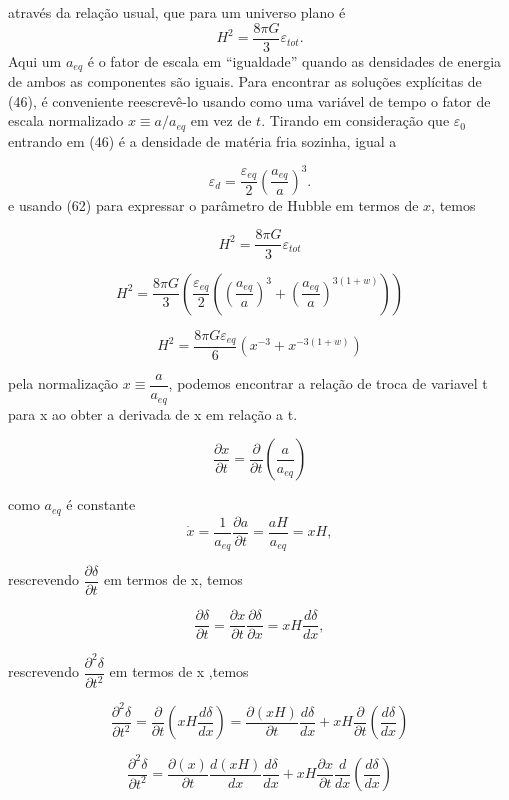\documentclass[a4paper,12pt]{article}
\begin{document}
através da relação usual, que para um universo plano é 
\begin{equation}
	H^2 = \dfrac{8\pi G}{3}\varepsilon_{tot}.
\end{equation}
Aqui um $a_{eq}$ é o fator de escala em “igualdade” quando as densidades de energia de ambos as componentes são iguais. Para encontrar as soluções explícitas de (46), é conveniente reescrevê-lo
usando como uma variável de tempo o fator de escala normalizado $x \equiv a / a_{eq}$ em vez de $t$. Tirando
em consideração que $\varepsilon_0$ entrando em (46) é a densidade de matéria fria sozinha, igual a

\begin{equation}
	\varepsilon_d = \dfrac{\varepsilon_{eq}}{2}\left(\dfrac{a_{eq}}{a}\right)^3.
\end{equation}
e usando (62) para expressar o parâmetro de Hubble em termos de $x$, temos

$$H^2 = \dfrac{8\pi G}{3}\varepsilon_{tot}$$

$$H^2 = \dfrac{8\pi G}{3}\left(\dfrac{\varepsilon_{eq}}{2}\left( \left( \dfrac{a_{eq}}{a}\right)^3 + \left(\dfrac{a_{eq}}{a} \right)^{3 (1+w)}\right)\right)$$

$$H^2 = \dfrac{8\pi G\varepsilon_{eq}}{6}\left( x^{-3} +x^{-3 (1+w)}\right)$$


pela normalização $x\equiv \dfrac{a}{a_{eq}}$, podemos encontrar a relação de troca de variavel t para x ao obter a derivada de x em relação a t.

$$\dfrac{\partial x}{\partial t}= \dfrac{\partial}{\partial t}\left( \dfrac{a}{a_{eq}}\right) $$

como $a_{eq}$ é constante
$$\dot{x}= \dfrac{1}{a_{eq}} \dfrac{\partial a}{\partial t}= \dfrac{a H}{a_{eq}} = xH,$$

rescrevendo  $\dfrac{\partial \delta}{\partial t }$ em termos de x, temos

$$\dfrac{\partial \delta}{\partial t } = \dfrac{\partial x}{\partial t } \dfrac{\partial \delta}{\partial x }= xH \dfrac{d \delta}{d x },$$

rescrevendo $\dfrac{\partial^2 \delta}{\partial t^2}$ em termos de x ,temos

$$\dfrac{\partial^2 \delta}{\partial t^2} = \dfrac{\partial }{\partial t }\left(xH \dfrac{d \delta}{d x } \right)= \dfrac{\partial (xH) }{\partial t }\dfrac{d \delta}{d x } + xH\dfrac{\partial }{\partial t }\left( \dfrac{d \delta}{d x } \right)$$

$$\dfrac{\partial^2 \delta}{\partial t^2} =\dfrac{\partial (x) }{\partial t }\dfrac{d(xH) }{dx }\dfrac{d \delta}{d x } + xH\dfrac{\partial x}{\partial t }\dfrac{d}{dx }\left( \dfrac{d \delta}{d x } \right)$$
\end{document}
